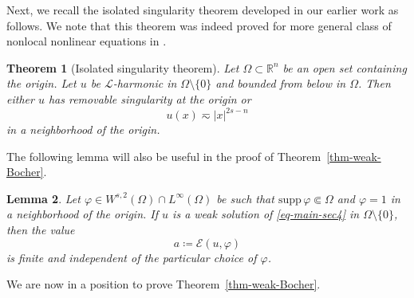 \documentclass[11pt]{amsart}
\theoremstyle{plain}
\newtheorem{theorem}{Theorem}[section]
\newtheorem{lemma}[theorem]{Lemma}
\theoremstyle{definition}
\numberwithin{equation}{section}
\begin{document}
Next, we recall the isolated singularity theorem developed in our earlier work \cite{KL24} as follows. We note that this theorem was indeed proved for more general class of nonlocal nonlinear equations in \cite{KL24}.

\begin{theorem}[Isolated singularity theorem]\label{thm-iso-sing}\cite[Theorem~1.3]{KL24}
Let $\Omega \subset \mathbb{R}^n$ be an open set containing the origin. Let $u$ be $\mathcal{L}$-harmonic in $\Omega \setminus \{0\}$ and bounded from below in $\Omega$. Then either $u$ has removable singularity at the origin or
\begin{equation*}
u(x) \eqsim |x|^{2s-n}
\end{equation*}
in a neighborhood of the origin.
\end{theorem}

The following lemma will also be useful in the proof of Theorem~\ref{thm-weak-Bocher}.

\begin{lemma}\cite[Lemma~5.3]{KL24}\label{lem-const}
Let $\varphi \in W^{s, 2}(\Omega) \cap L^\infty(\Omega)$ be such that $\mathrm{supp}\,{\varphi} \Subset \Omega$ and $\varphi= 1$ in a neighborhood of the origin. If $u$ is a weak solution of \eqref{eq-main-sec4} in $\Omega \setminus \{0\}$, then the value
\begin{equation*}
a \coloneqq \mathcal{E}(u, \varphi)
\end{equation*}
is finite and independent of the particular choice of $\varphi$.
\end{lemma}

We are now in a position to prove Theorem~\ref{thm-weak-Bocher}.
\end{document}
